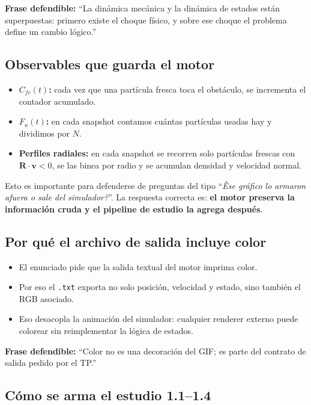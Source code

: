 \documentclass[11pt]{article}
\begin{document}
\textbf{Frase defendible:} ``La din\'amica mec\'anica y la din\'amica de estados est\'an superpuestas: primero existe el choque f\'isico, y sobre ese choque el problema define un cambio l\'ogico.''

\subsection{Observables que guarda el motor}

\begin{itemize}
  \item \textbf{$C_{fc}(t)$:} cada vez que una part\'icula fresca toca el obst\'aculo, se incrementa el contador acumulado.
  \item \textbf{$F_u(t)$:} en cada snapshot contamos cu\'antas part\'iculas usadas hay y dividimos por $N$.
  \item \textbf{Perfiles radiales:} en cada snapshot se recorren solo part\'iculas frescas con $\bm R\cdot\bm v<0$, se las binea por radio y se acumulan densidad y velocidad normal.
\end{itemize}

Esto es importante para defenderse de preguntas del tipo ``\emph{\`Ese gr\'afico lo armaron afuera o sale del simulador?}''. La respuesta correcta es: \textbf{el motor preserva la informaci\'on cruda y el pipeline de estudio la agrega despu\'es}.

\subsection{Por qu\'e el archivo de salida incluye color}

\begin{itemize}
  \item El enunciado pide que la salida textual del motor imprima color.
  \item Por eso el \texttt{.txt} exporta no solo posici\'on, velocidad y estado, sino tambi\'en el RGB asociado.
  \item Eso desacopla la animaci\'on del simulador: cualquier renderer externo puede colorear sin reimplementar la l\'ogica de estados.
\end{itemize}

\textbf{Frase defendible:} ``Color no es una decoraci\'on del GIF; es parte del contrato de salida pedido por el TP.''

\subsection{C\'omo se arma el estudio 1.1--1.4}
\end{document}
